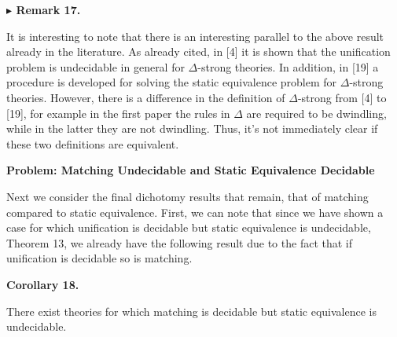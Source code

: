  
 
\par\medskip\noindent\textbf{$\blacktriangleright$ Remark 17.}\par
 
 
It is interesting to note that there is an interesting parallel to the above result already in the literature. As already cited, in [4] it is shown that the unification problem is undecidable in general for $\Delta$-strong theories. In addition, in [19] a procedure is developed for solving the static equivalence problem for $\Delta$-strong theories. However, there is a difference in the definition of $\Delta$-strong from [4] to [19], for example in the first paper the rules in $\Delta$ are required to be dwindling, while in the latter they are not dwindling. Thus, it’s not immediately clear if these two definitions are equivalent.\par
 
 
 
 
 
 
\par\medskip\noindent\textbf{Problem: Matching Undecidable and Static Equivalence Decidable}\par
 
 
Next we consider the final dichotomy results that remain, that of matching compared to static equivalence. First, we can note that since we have shown a case for which unification is decidable but static equivalence is undecidable, Theorem 13, we already have the following result due to the fact that if unification is decidable so is matching.\par
 
 
 
\par\medskip\noindent\textbf{Corollary 18.}\par
 
 
There exist theories for which matching is decidable but static equivalence is undecidable.\par
 
